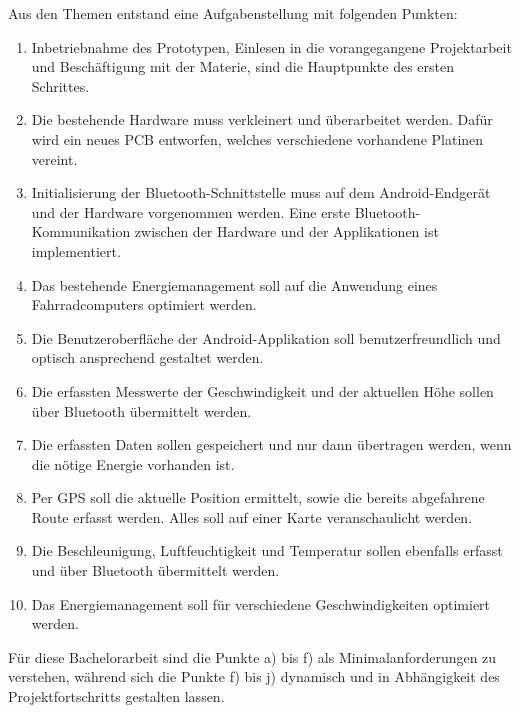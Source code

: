 Aus den Themen entstand eine Aufgabenstellung mit folgenden Punkten:


\begin{enumerate} 

\item Inbetriebnahme des Prototypen, Einlesen in die vorangegangene Projektarbeit und Beschäftigung mit der Materie, sind die Hauptpunkte des ersten Schrittes.

\item Die bestehende Hardware muss verkleinert und überarbeitet werden. Dafür wird ein neues PCB entworfen, welches verschiedene vorhandene Platinen vereint.

\item Initialisierung der Bluetooth-Schnittstelle muss auf dem Android-Endgerät und der Hardware vorgenommen werden. Eine erste Bluetooth-Kommunikation zwischen der Hardware und der Applikationen ist implementiert.

\item Das bestehende Energiemanagement soll auf die Anwendung eines Fahrradcomputers optimiert werden.

\item Die Benutzeroberfläche der Android-Applikation soll benutzerfreundlich und optisch ansprechend gestaltet werden.

\item Die erfassten Messwerte der Geschwindigkeit und der aktuellen Höhe sollen über Bluetooth übermittelt werden.

\item	Die erfassten Daten sollen gespeichert und nur dann übertragen werden, wenn die nötige Energie vorhanden ist.

\item	Per GPS soll die aktuelle Position ermittelt, sowie die bereits abgefahrene Route erfasst werden. Alles soll auf einer Karte veranschaulicht werden.

\item	Die Beschleunigung, Luftfeuchtigkeit und Temperatur sollen ebenfalls erfasst und über Bluetooth übermittelt werden.


\item	Das Energiemanagement soll für verschiedene Geschwindigkeiten optimiert werden.
\end{enumerate}

Für diese Bachelorarbeit sind die Punkte a) bis f) als Minimalanforderungen zu verstehen, während sich die Punkte f) bis j) dynamisch und in Abhängigkeit des Projektfortschritts gestalten lassen.



